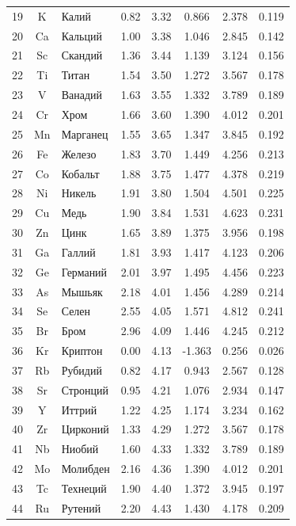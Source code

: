 \documentclass[12pt,a4paper]{article}
\theoremstyle{remark}
\begin{document}
\begin{longtable}{|c|c|p{2.5cm}|c|c|c|c|c|}
		19 & K & Калий & 0.82 & 3.32 & 0.866 & 2.378 & 0.119 \\
		20 & Ca & Кальций & 1.00 & 3.38 & 1.046 & 2.845 & 0.142 \\
		21 & Sc & Скандий & 1.36 & 3.44 & 1.139 & 3.124 & 0.156 \\
		22 & Ti & Титан & 1.54 & 3.50 & 1.272 & 3.567 & 0.178 \\
		23 & V & Ванадий & 1.63 & 3.55 & 1.332 & 3.789 & 0.189 \\
		24 & Cr & Хром & 1.66 & 3.60 & 1.390 & 4.012 & 0.201 \\
		25 & Mn & Марганец & 1.55 & 3.65 & 1.347 & 3.845 & 0.192 \\
		26 & Fe & Железо & 1.83 & 3.70 & 1.449 & 4.256 & 0.213 \\
		27 & Co & Кобальт & 1.88 & 3.75 & 1.477 & 4.378 & 0.219 \\
		28 & Ni & Никель & 1.91 & 3.80 & 1.504 & 4.501 & 0.225 \\
		29 & Cu & Медь & 1.90 & 3.84 & 1.531 & 4.623 & 0.231 \\
		30 & Zn & Цинк & 1.65 & 3.89 & 1.375 & 3.956 & 0.198 \\
		31 & Ga & Галлий & 1.81 & 3.93 & 1.417 & 4.123 & 0.206 \\
		32 & Ge & Германий & 2.01 & 3.97 & 1.495 & 4.456 & 0.223 \\
		33 & As & Мышьяк & 2.18 & 4.01 & 1.456 & 4.289 & 0.214 \\
		34 & Se & Селен & 2.55 & 4.05 & 1.571 & 4.812 & 0.241 \\
		35 & Br & Бром & 2.96 & 4.09 & 1.446 & 4.245 & 0.212 \\
		36 & Kr & Криптон & 0.00 & 4.13 & -1.363 & 0.256 & 0.026 \\
		37 & Rb & Рубидий & 0.82 & 4.17 & 0.943 & 2.567 & 0.128 \\
		38 & Sr & Стронций & 0.95 & 4.21 & 1.076 & 2.934 & 0.147 \\
		39 & Y & Иттрий & 1.22 & 4.25 & 1.174 & 3.234 & 0.162 \\
		40 & Zr & Цирконий & 1.33 & 4.29 & 1.272 & 3.567 & 0.178 \\
		41 & Nb & Ниобий & 1.60 & 4.33 & 1.332 & 3.789 & 0.189 \\
		42 & Mo & Молибден & 2.16 & 4.36 & 1.390 & 4.012 & 0.201 \\
		43 & Tc & Технеций & 1.90 & 4.40 & 1.372 & 3.945 & 0.197 \\
		44 & Ru & Рутений & 2.20 & 4.43 & 1.430 & 4.178 & 0.209 \\

\end{longtable}
\end{document}
